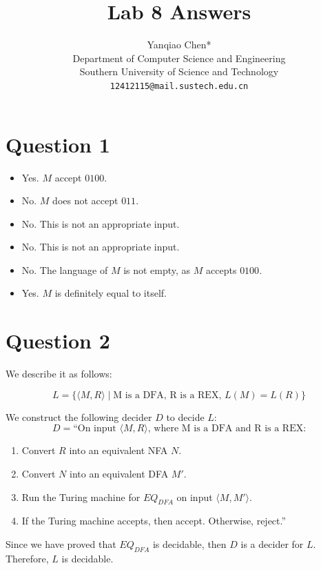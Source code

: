 \documentclass[a4paper, UTF-8]{article}
\theoremstyle{plain}
\begin{document}
\title{\bf{Lab 8 Answers}}
\author{Yanqiao Chen*\\ 
  Department of Computer Science and Engineering\\
  Southern University of Science and Technology\\
  \texttt{12412115@mail.sustech.edu.cn}
  }
\maketitle

\section{Question 1} 

\begin{itemize}
    \item Yes. $M$ accept $0100$. 
    \item No. $M$ does not accept $011$. 
    \item No. This is not an appropriate input. 
    \item No. This is not an appropriate input.
    \item No. The language of $M$ is not empty, as $M$ accepts $0100$.
    \item Yes. $M$ is definitely equal to itself.
\end{itemize} 

\section{Question 2} 

We describe it as follows: 

$$
L = \{\langle M, R \rangle \mid \text{M is a DFA, R is a REX, } L(M) = L(R)\}
$$

We construct the following decider $D$ to decide $L$:
$$
D = \text{``On input } \langle M, R \rangle \text{, where M is a DFA and R is a REX:}
$$
\begin{enumerate}
    \item Convert $R$ into an equivalent NFA $N$. 
    \item Convert $N$ into an equivalent DFA $M'$. 
    \item Run the Turing machine for $EQ_{DFA}$ on input $\langle M, M' \rangle$. 
    \item If the Turing machine accepts, then accept. Otherwise, reject.''
\end{enumerate}
Since we have proved that $EQ_{DFA}$ is decidable, then $D$ is a decider for $L$. Therefore, $L$ is decidable.
\end{document}
